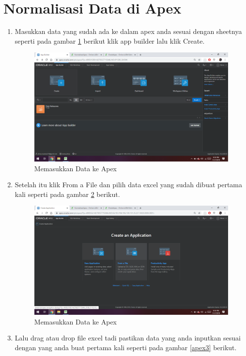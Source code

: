 \documentclass[12pt, times new roman, a4paper]{article}
\begin{document}
\section{Normalisasi Data di Apex}
\begin{enumerate}
    \item Masukkan data yang sudah ada ke dalam apex anda sesuai dengan sheetnya seperti pada gambar \ref{apex1} berikut klik app builder lalu klik Create.
        \begin{figure}[!htbp]
        \centering
        \includegraphics[scale=0.31]{figures/apex1.png}
        \caption{Memasukkan Data ke Apex}
        \label{apex1}
    \end{figure}
    \item Setelah itu klik From a File dan pilih data excel yang sudah dibuat pertama kali seperti pada gambar \ref{apex2} berikut.
            \begin{figure}[!htbp]
        \centering
        \includegraphics[scale=0.25]{figures/apex2.png}
        \caption{Memasukkan Data ke Apex}
        \label{apex2}
    \end{figure}
    \item Lalu drag atau drop file excel tadi pastikan data yang anda inputkan sesuai dengan yang anda buat pertama kali seperti pada gambar \ref{apex3} berikut.

\end{enumerate}
\end{document}
